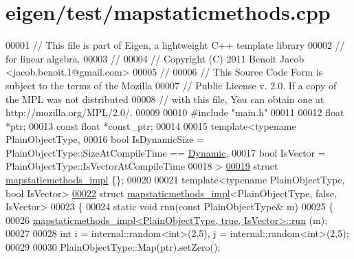 \hypertarget{eigen_2test_2mapstaticmethods_8cpp_source}{}\section{eigen/test/mapstaticmethods.cpp}
\label{eigen_2test_2mapstaticmethods_8cpp_source}

\begin{DoxyCode}
00001 \textcolor{comment}{// This file is part of Eigen, a lightweight C++ template library}
00002 \textcolor{comment}{// for linear algebra.}
00003 \textcolor{comment}{//}
00004 \textcolor{comment}{// Copyright (C) 2011 Benoit Jacob <jacob.benoit.1@gmail.com>}
00005 \textcolor{comment}{//}
00006 \textcolor{comment}{// This Source Code Form is subject to the terms of the Mozilla}
00007 \textcolor{comment}{// Public License v. 2.0. If a copy of the MPL was not distributed}
00008 \textcolor{comment}{// with this file, You can obtain one at http://mozilla.org/MPL/2.0/.}
00009 
00010 \textcolor{preprocessor}{#include "main.h"}
00011 
00012 \textcolor{keywordtype}{float} *ptr;
00013 \textcolor{keyword}{const} \textcolor{keywordtype}{float} *const\_ptr;
00014 
00015 \textcolor{keyword}{template}<\textcolor{keyword}{typename} PlainObjectType,
00016          \textcolor{keywordtype}{bool} IsDynamicSize = PlainObjectType::SizeAtCompileTime == \hyperlink{namespace_eigen_ad81fa7195215a0ce30017dfac309f0b2}{Dynamic},
00017          \textcolor{keywordtype}{bool} IsVector = PlainObjectType::IsVectorAtCompileTime
00018 >
\hyperlink{structmapstaticmethods__impl}{00019} \textcolor{keyword}{struct }\hyperlink{structmapstaticmethods__impl}{mapstaticmethods\_impl} \{\};
00020 
00021 \textcolor{keyword}{template}<\textcolor{keyword}{typename} PlainObjectType, \textcolor{keywordtype}{bool} IsVector>
\hyperlink{structmapstaticmethods__impl_3_01_plain_object_type_00_01false_00_01_is_vector_01_4}{00022} \textcolor{keyword}{struct }\hyperlink{structmapstaticmethods__impl}{mapstaticmethods\_impl}<PlainObjectType, false, IsVector>
00023 \{
00024   \textcolor{keyword}{static} \textcolor{keywordtype}{void} run(\textcolor{keyword}{const} PlainObjectType& m)
00025   \{
00026     \hyperlink{structmapstaticmethods__impl}{mapstaticmethods\_impl<PlainObjectType, true, IsVector>::run}
      (m);
00027 
00028     \textcolor{keywordtype}{int} i = internal::random<int>(2,5), j = internal::random<int>(2,5);
00029 
00030     PlainObjectType::Map(ptr).setZero();

\end{DoxyCode}
